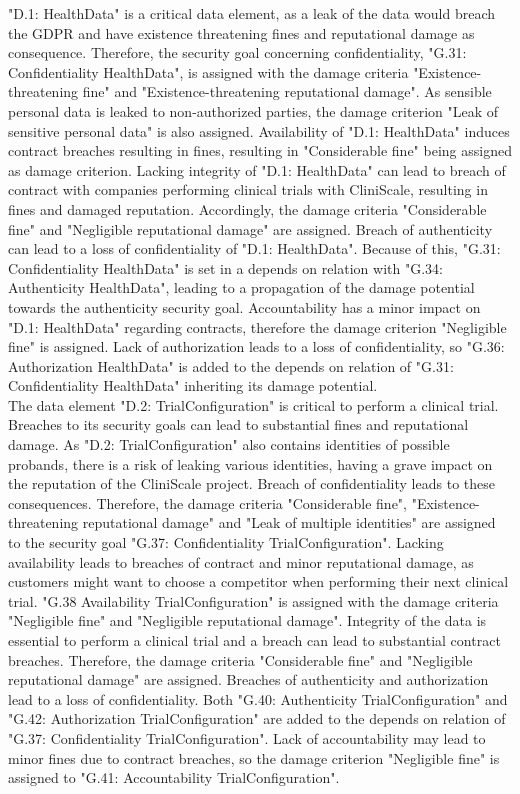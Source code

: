 "D.1: HealthData" is a critical data element, as a leak of the data would breach the GDPR and have existence threatening fines and reputational damage as consequence. Therefore, the security goal concerning confidentiality, "G.31: Confidentiality HealthData", is assigned with the damage criteria "Existence-threatening fine" and "Existence-threatening reputational damage". As sensible personal data is leaked to non-authorized parties, the damage criterion "Leak of sensitive personal data" is also assigned. Availability of "D.1: HealthData" induces contract breaches resulting in fines, resulting in "Considerable fine" being assigned as damage criterion. Lacking integrity of "D.1: HealthData" can lead to breach of contract with companies performing clinical trials with CliniScale, resulting in fines and damaged reputation. Accordingly, the damage criteria "Considerable fine" and "Negligible reputational damage" are assigned. Breach of authenticity can lead to a loss of confidentiality of "D.1: HealthData". Because of this, "G.31: Confidentiality HealthData" is set in a depends on relation with "G.34: Authenticity HealthData", leading to a propagation of the damage potential towards the authenticity security goal. Accountability has a minor impact on "D.1: HealthData" regarding contracts, therefore the damage criterion "Negligible fine" is assigned. Lack of authorization leads to a loss of confidentiality, so "G.36: Authorization HealthData" is added to the depends on relation of "G.31: Confidentiality HealthData" inheriting its damage potential.\\
\newline
The data element "D.2: TrialConfiguration" is critical to perform a clinical trial. \\Breaches to its security goals can lead to substantial fines and reputational damage. As "D.2: TrialConfiguration" also contains identities of possible probands, there is a risk of leaking various identities, having a grave impact on the reputation of the CliniScale project. Breach of confidentiality leads to these consequences. Therefore, the damage criteria "Considerable fine", "Existence-threatening reputational damage" and "Leak of multiple identities" are assigned to the security goal "G.37: Confidentiality TrialConfiguration". Lacking availability leads to breaches of contract and minor reputational damage, as customers might want to choose a competitor when performing their next clinical trial. "G.38 Availability TrialConfiguration" is assigned with the damage criteria "Negligible fine" and "Negligible reputational damage". Integrity of the data is essential to perform a clinical trial and a breach can lead to substantial contract breaches. Therefore, the damage criteria "Considerable fine" and "Negligible reputational damage" are assigned. Breaches of authenticity and authorization lead to a loss of confidentiality. Both "G.40: Authenticity TrialConfiguration" and "G.42: Authorization TrialConfiguration" are added to the depends on relation of "G.37: Confidentiality TrialConfiguration". Lack of accountability may lead to minor fines due to contract breaches, so the damage criterion "Negligible fine" is assigned to "G.41: Accountability TrialConfiguration".\\
